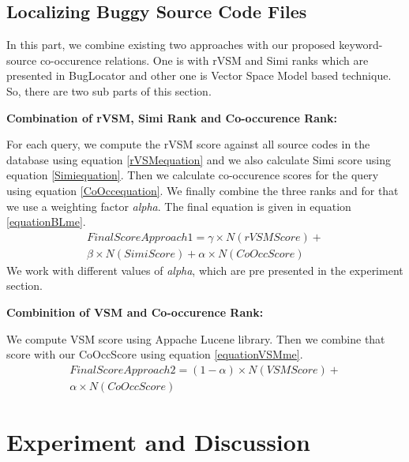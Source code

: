 \documentclass[conference]{IEEEtran}
\begin{document}
\subsection{Localizing Buggy Source Code Files} 
In this part, we combine existing two approaches with our proposed keyword-source co-occurence relations. One is with rVSM and Simi ranks which are presented in BugLocator and other one is Vector Space Model based technique. So, there are two sub parts of this section.

\textbf{Combination of rVSM, Simi Rank and Co-occurence Rank:}

For each query, we compute the rVSM score against all source codes in the database using equation \ref{rVSMequation} and we also calculate Simi score using equation \ref{Simiequation}. Then we calculate co-occurence scores for the query using equation \ref{CoOccequation}.
We finally combine the three ranks and for that we use a weighting factor \textit{alpha}.
The final equation is given in equation \ref{equationBLme}.
\begin{multline}\label{equationBLme}
FinalScoreApproach1=\gamma \times N(rVSMScore)+
\\ \beta \times N(SimiScore) + \alpha \times N(CoOccScore)
\end{multline}
We work with different values of \textit{alpha}, which are pre presented in the experiment section.

\textbf{Combinition of VSM and Co-occurence Rank:}

We compute VSM score using Appache Lucene library. Then we combine that score with our CoOccScore using equation \ref{equationVSMme}.
\begin{multline}\label{equationVSMme}
FinalScoreApproach2=(1-\alpha )\times N(VSMScore)+ \\
\alpha \times N(CoOccScore)
\end{multline}


\section{Experiment and Discussion}




\end{document}
